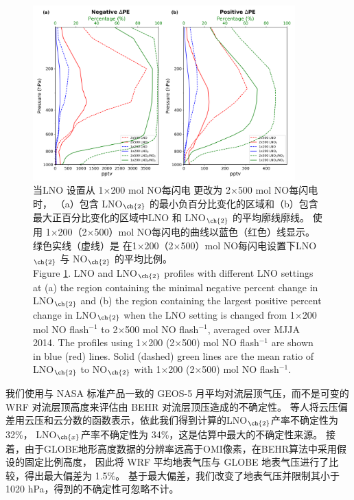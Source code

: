 \begin{figure}[H]
\centering
\includegraphics[width=0.9\textwidth]{./figures/us_lno2_profile.png}
\caption{当LNO 设置从 1$\times$200 mol NO每闪电 更改为 2$\times$500 mol NO每闪电 时，
（a）包含 LNO$_{\ch{2}}$ 的最小负百分比变化的区域和（b）包含最大正百分比变化的区域中LNO 和 LNO$_{\ch{2}}$ 的平均廓线廓线。
使用 1$\times$200（2$\times$500）mol NO每闪电的曲线以蓝色（红色）线显示。
绿色实线（虚线）是 在1$\times$200（2$\times$500）mol NO每闪电设置下LNO$_{\ch{2}}$ 与 NO$_{\ch{2}}$ 的平均比例。\\
Figure \ref{fig:us_lno2_profile}. LNO and LNO$_{\ch{2}}$ profiles with different LNO settings at (a) the region containing the minimal negative percent change in LNO$_{\ch{2}}$ and (b) the region containing the largest positive percent change in LNO$_{\ch{2}}$ when the LNO setting is changed from 1$\times$200 mol NO flash$^{-1}$ to 2$\times$500 mol NO flash$^{-1}$, averaged over MJJA 2014.
The profiles using 1$\times$200 (2$\times$500) mol NO flash$^{-1}$ are shown in blue (red) lines.
Solid (dashed) green lines are the mean ratio of LNO$_{\ch{2}}$ to NO$_{\ch{2}}$ with 1$\times$200 (2$\times$500) mol NO flash$^{-1}$.}
\label{fig:us_lno2_profile}
\end{figure}


我们使用与 NASA 标准产品一致的 GEOS-5 月平均对流层顶气压，而不是可变的 WRF 对流层顶高度来评估由 BEHR 对流层顶压造成的不确定性。
\citet{Acarreta.2004}等人将云压偏差用云压和云分数的函数表示，依此我们得到计算的LNO$_{\ch{2}}$产率不确定性为 32\%，
LNO$_{\ch{x}}$产率不确定性为 34\%，这是估算中最大的不确定性来源。
接着，由于GLOBE地形高度数据的分辨率远高于OMI像素，在BEHR算法中采用假设的固定比例高度，
因此\citet{Laughner.2019a}将 WRF 平均地表气压与 GLOBE 地表气压进行了比较，得出最大偏差为 1.5\%。
基于最大偏差，我们改变了地表气压并限制其小于 1020 hPa，得到的不确定性可忽略不计。

